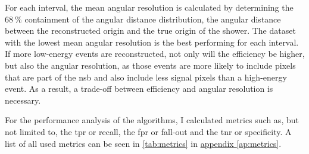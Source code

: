 For each interval, the mean angular resolution is calculated by determining the
\(\SI{68}{\percent}\) containment of the angular distance distribution, \ie the angular distance
between the reconstructed origin and the true origin of the shower.
The dataset with the lowest mean angular resolution is the best performing for each interval.
If more low-energy events are reconstructed, not only will the efficiency be higher, but also the angular resolution,
as those events are more likely to include pixels that are part of the \gls{nsb} and also include less signal pixels
than a high-energy event.
As a result, a trade-off between efficiency and angular resolution is necessary.

For the performance analysis of the algorithms, I calculated metrics such as, but not limited to, the \gls{tpr} or recall,
the \gls{fpr} or fall-out and the \gls{tnr} or specificity. A list of all used metrics can be seen in \autoref{tab:metrics}
in \hyperref[ap:metrics]{appendix \ref{ap:metrics}}.